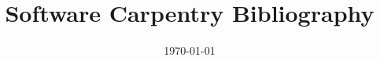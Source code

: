 \documentclass{article}
\title{Software Carpentry Bibliography}
\date{\today}
\begin{document}
\maketitle
\nocite{*}


\end{document}
